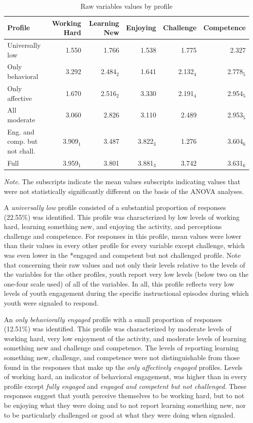 \documentclass[]{msu-thesis}
\theoremstyle{definition}
\theoremstyle{definition}
\theoremstyle{definition}
\theoremstyle{remark}
\begin{document}
\begin{landscape}\begin{table}

\caption{\label{tab:unnamed-chunk-13}Raw variables values by profile}
\centering
\begin{tabular}[t]{lrrrrr}
\toprule
Profile & Working Hard & Learning New & Enjoying & Challenge & Competence\\
\midrule
Universally low & 1.550 & 1.766 & 1.538 & 1.775 & 2.327\\
Only behavioral & 3.292 & 2.484$_2$ & 1.641 & 2.132$_4$ & 2.778$_5$\\
Only affective & 1.670 & 2.516$_2$ & 3.330 & 2.191$_4$ & 2.954$_5$\\
All moderate & 3.060 & 2.826 & 3.110 & 2.489 & 2.953$_5$\\
Eng. and comp. but not chall. & 3.909$_1$ & 3.487 & 3.822$_3$ & 1.276 & 3.604$_6$\\
Full & 3.959$_1$ & 3.801 & 3.881$_3$ & 3.742 & 3.631$_6$\\
\bottomrule
\end{tabular}
\end{table}
\begin{flushleft}\emph{Note}. The subscripts indicate the mean values subscripts
indicating values that were not statistically significantly different on
the basis of the ANOVA analyses.\end{flushleft}
\end{landscape}

A \emph{universally low} profile consisted of a substantial proportion
of responses (22.55\%) was identified. This profile was characterized by
low levels of working hard, learning something new, and enjoying the
activity, and perceptions challenge and competence. For responses in
this profile, mean values were lower than their values in every other
profile for every variable except challenge, which was even lower in the
*engaged and competent but not challenged profile. Note that concerning
their raw values and not only their levels relative to the levels of the
variables for the other profiles, youth report very low levels (below
two on the one-four scale used) of all of the variables. In all, this
profile reflects very low levels of youth engagement during the specific
instructional episodes during which youth were signaled to respond.

An \emph{only behaviorally engaged} profile with a small proportion of
responses (12.51\%) was identified. This profile was characterized by
moderate levels of working hard, very low enjoyment of the activity, and
moderate levels of learning something new and challenge and competence.
The levels of reporting learning something new, challenge, and
competence were not distinguishable from those found in the responses
that make up the \emph{only affectively engaged} profiles. Levels of
working hard, an indicator of behavioral engagement, was higher than in
every profile except \emph{fully engaged} and \emph{engaged and
competent but not challenged}. These responses suggest that youth
perceive themselves to be working hard, but to not be enjoying what they
were doing and to not report learning something new, nor to be
particularly challenged or good at what they were doing when signaled.
\end{document}
